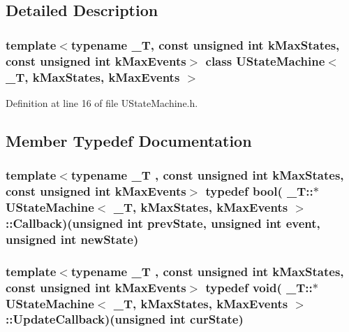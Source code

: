 \subsection{Detailed Description}
\subsubsection*{template$<$typename \_\-T, const unsigned int kMaxStates, const unsigned int kMaxEvents$>$ class UStateMachine$<$ \_\-T, kMaxStates, kMaxEvents $>$}



Definition at line 16 of file UStateMachine.h.

\subsection{Member Typedef Documentation}
\hypertarget{class_u_state_machine_963f51f22ea58913720e723b793db8f2}{
\subsubsection[{Callback}]{\setlength{\rightskip}{0pt plus 5cm}template$<$typename \_\-T , const unsigned int kMaxStates, const unsigned int kMaxEvents$>$ typedef bool( \_\-T::$\ast$ {\bf UStateMachine}$<$ \_\-T, kMaxStates, kMaxEvents $>$::{\bf Callback})(unsigned int prevState, unsigned int event, unsigned int newState)}}
\label{class_u_state_machine_963f51f22ea58913720e723b793db8f2}


\hypertarget{class_u_state_machine_15216ad4481a4d78546f59992e7aaffc}{
\subsubsection[{UpdateCallback}]{\setlength{\rightskip}{0pt plus 5cm}template$<$typename \_\-T , const unsigned int kMaxStates, const unsigned int kMaxEvents$>$ typedef void( \_\-T::$\ast$ {\bf UStateMachine}$<$ \_\-T, kMaxStates, kMaxEvents $>$::{\bf UpdateCallback})(unsigned int curState)}}
\label{class_u_state_machine_15216ad4481a4d78546f59992e7aaffc}




